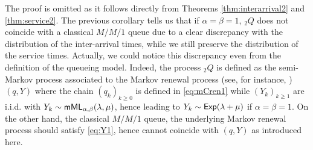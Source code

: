 \documentclass[]{amsart}
\numberwithin{equation}{section}
\theoremstyle{remark}
\theoremstyle{definition}
\DeclareMathOperator{\bP}{\mathbb{P}}
\begin{document}
The proof is omitted as it follows directly from Theorems \ref{thm:interarrival2} and \ref{thm:service2}. The previous corollary tells us that if $\alpha=\beta=1$, ${}_2Q$ does not coincide with a classical $M/M/1$ queue due to a clear discrepancy with the distribution of the inter-arrival times, while we still preserve the distribution of the service times. Actually, we could notice this discrepancy even from the definition of the queueing model. Indeed, the process ${}_2Q$ is defined as the semi-Markov process associated to the Markov renewal process (see, for instance, \cite{pyke1961markov,gikhman2004theory}) $(q,Y)$ where the chain $(q_k)_{k \ge 0}$ is defined in \eqref{eq:mCren1} while $(Y_k)_{k \ge 1}$ are i.i.d. with $Y_k \sim {\sf mML}_{\alpha,\beta}(\lambda,\mu)$, hence leading to $Y_k \sim {\sf Exp}(\lambda+\mu)$ if $\alpha=\beta=1$. On the other hand, the classical $M/M/1$ queue, {the underlying Markov renewal process should satisfy \eqref{eq:Y1}, hence cannot coincide with $(q,Y)$ as introduced here.}
\end{document}
